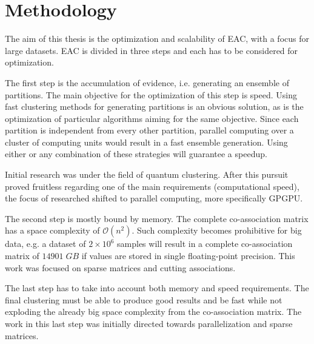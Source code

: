 
\chapter{Methodology}
\label{chapter:methodology}




The aim of this thesis is the optimization and scalability of EAC, with a focus for large datasets.
EAC is divided in three steps and each has to be considered for optimization.

The first step is the accumulation of evidence, i.e. generating an ensemble of partitions.
The main objective for the optimization of this step is speed.
Using fast clustering methods for generating partitions is an obvious solution, as is the optimization of particular algorithms aiming for the same objective.
Since each partition is independent from every other partition, parallel computing over a cluster of computing units would result in a fast ensemble generation.
Using either or any combination of these strategies will guarantee a speedup.

Initial research was under the field of quantum clustering.
After this pursuit proved fruitless regarding one of the main requirements (computational speed), the focus of researched shifted to parallel computing, more specifically GPGPU. 
	
The second step is mostly bound by memory.
The complete co-association matrix has a space complexity of $\mathcal{O}(n^2)$.
Such complexity becomes prohibitive for big data, e.g. a dataset of $2 \times 10^6$ samples will result in a complete co-association matrix of $14901 \; GB$ if values are stored in single floating-point precision.
This work was focused on sparse matrices and cutting associations.

The last step has to take into account both memory and speed requirements.
The final clustering must be able to produce good results and be fast while not exploding the already big space complexity from the co-association matrix.
The work in this last step was initially directed towards parallelization and sparse matrices.

